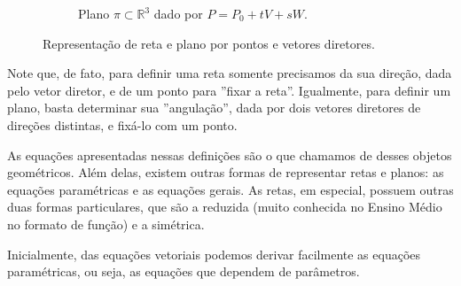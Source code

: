 \documentclass[../main.tex]{subfiles}
\begin{document}
\begin{figure}[h]
\begin{subfigure}[t]{0.45\textwidth}
					\caption{Plano $\pi \subset \mathbb{R}^3$ dado por $P=P_0+tV+sW$.}
				\end{subfigure}
				
				\caption{Representação de reta e plano por pontos e vetores diretores.}
			\end{figure}
			Note que, de fato, para definir uma reta somente precisamos da sua direção, dada pelo vetor diretor, e de um ponto para ''fixar a reta''. Igualmente, para definir um plano, basta determinar sua ''angulação'', dada por dois vetores diretores de direções distintas, e fixá-lo com um ponto.
			
			As equações apresentadas nessas definições são o que chamamos de  desses objetos geométricos. Além delas, existem outras formas de representar retas e planos: as equações paramétricas e as equações  gerais. As retas, em especial, possuem outras duas formas particulares, que são a reduzida (muito conhecida no Ensino Médio no formato de função) e a simétrica.
			
			Inicialmente, das equações vetoriais podemos derivar facilmente as equações paramétricas, ou seja, as equações que dependem de parâmetros.
			
\end{document}
